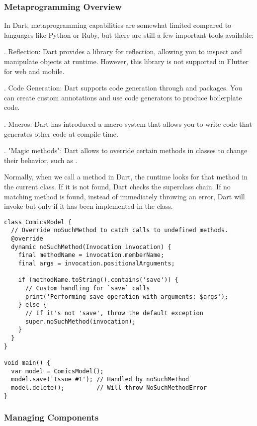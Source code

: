 \subsubsection{Metaprogramming Overview}

In Dart, metaprogramming capabilities are somewhat limited compared to languages like Python or Ruby, but there are
still a few important tools available:

. Reflection: Dart provides a  library for reflection, allowing you to inspect and manipulate
objects at runtime. However, this library is not supported in Flutter for web and mobile.

. Code Generation: Dart supports code generation through  and  packages.
You can create custom annotations and use code generators to produce boilerplate code.

. Macros: Dart has introduced a macro system that allows you to write code that generates other code at
compile time.

. "Magic methods": Dart allows to override certain methods in classes to change their behavior,
such as .

Normally, when we call a method in Dart, the runtime looks for that method in the current class. If it is not found,
Dart checks the superclass chain. If no matching method is found, instead of immediately throwing an error, Dart will
invoke  but only if it has been implemented in the class.

\begin{lstlisting}
class ComicsModel {
  // Override noSuchMethod to catch calls to undefined methods.
  @override
  dynamic noSuchMethod(Invocation invocation) {
    final methodName = invocation.memberName;
    final args = invocation.positionalArguments;

    if (methodName.toString().contains('save')) {
      // Custom handling for `save` calls
      print('Performing save operation with arguments: $args');
    } else {
      // If it's not 'save', throw the default exception
      super.noSuchMethod(invocation);
    }
  }
}

void main() {
  var model = ComicsModel();
  model.save('Issue #1'); // Handled by noSuchMethod
  model.delete();         // Will throw NoSuchMethodError
}
\end{lstlisting}


\newpage
\subsubsection{Managing Components}

